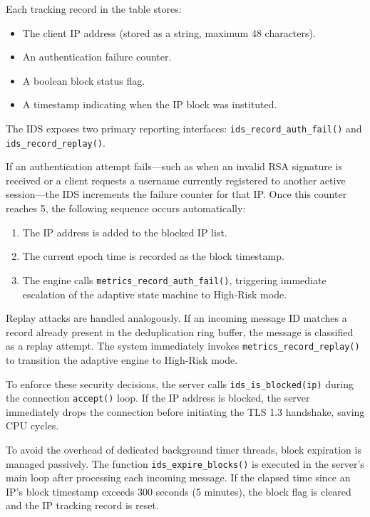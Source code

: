 \documentclass[conference]{IEEEtran}
\begin{document}
Each tracking record in the table stores:
\begin{itemize}
    \item The client IP address (stored as a string, maximum 48 characters).
    \item An authentication failure counter.
    \item A boolean block status flag.
    \item A timestamp indicating when the IP block was instituted.
\end{itemize}

The IDS exposes two primary reporting interfaces: \texttt{ids\_record\_auth\_fail()} and \texttt{ids\_record\_replay()}. 

If an authentication attempt fails—such as when an invalid RSA signature is received or a client requests a username currently registered to another active session—the IDS increments the failure counter for that IP. Once this counter reaches 5, the following sequence occurs automatically:
\begin{enumerate}
    \item The IP address is added to the blocked IP list.
    \item The current epoch time is recorded as the block timestamp.
    \item The engine calls \texttt{metrics\_record\_auth\_fail()}, triggering immediate escalation of the adaptive state machine to High-Risk mode.
\end{enumerate}

Replay attacks are handled analogously. If an incoming message ID matches a record already present in the deduplication ring buffer, the message is classified as a replay attempt. The system immediately invokes \texttt{metrics\_record\_replay()} to transition the adaptive engine to High-Risk mode.

To enforce these security decisions, the server calls \texttt{ids\_is\_blocked(ip)} during the connection \texttt{accept()} loop. If the IP address is blocked, the server immediately drops the connection before initiating the TLS 1.3 handshake, saving CPU cycles. 

To avoid the overhead of dedicated background timer threads, block expiration is managed passively. The function \texttt{ids\_expire\_blocks()} is executed in the server's main loop after processing each incoming message. If the elapsed time since an IP's block timestamp exceeds 300 seconds (5 minutes), the block flag is cleared and the IP tracking record is reset. 
\end{document}
